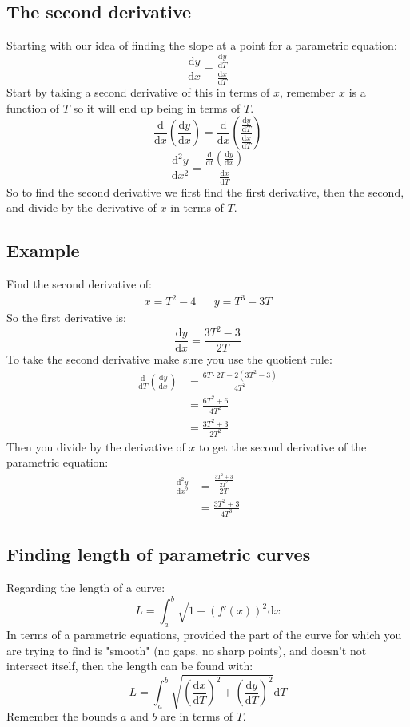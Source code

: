 \documentclass{report}
\begin{document}
    \subsection{The second derivative}
        Starting with our idea of finding the slope at a point for a parametric equation:
        \[\frac{\mathrm{d}y}{\mathrm{d}x} = \frac{\frac{\mathrm{d}y}{\mathrm{d}T}}{\frac{\mathrm{d}x}{\mathrm{d}T}}\]
        Start by taking a second derivative of this in terms of \(x\), remember \(x\) is a function of \(T\) so it will end up being in terms of \(T\).
        \[\frac{\mathrm{d}}{\mathrm{d}x} \left( \frac{\mathrm{d}y}{\mathrm{d}x} \right) = \frac{\mathrm{d}}{\mathrm{d}x} \left( \frac{\frac{\mathrm{d}y}{\mathrm{d}T}}{\frac{\mathrm{d}x}{\mathrm{d}T}} \right)\]
        \[\frac{\mathrm{d}^2 y}{\mathrm{d} x^2} = \frac{\frac{\mathrm{d}}{\mathrm{d}t} \left( \frac{\mathrm{d}y}{\mathrm{d}x} \right)}{\frac{\mathrm{d}x}{\mathrm{d}T}}\]
        So to find the second derivative we first find the first derivative, then the second, and divide by the derivative of \(x\) in terms of \(T\).
    
    \subsection{Example}
        Find the second derivative of:
        \begin{align*}
            x = T^2 - 4 &&
            y = T^3 - 3T
        \end{align*}
        So the first derivative is:
        \[\frac{\mathrm{d}y}{\mathrm{d}x} = \frac{3T^2 - 3}{2T}\]
        To take the second derivative make sure you use the quotient rule:
        \begin{align*}
            \frac{\mathrm{d}}{\mathrm{d}T} \left( \frac{\mathrm{d}y}{ \mathrm{d}x} \right) &= \frac{6T \cdot 2T - 2 (3T^2 - 3)}{4T^2} \\
            &= \frac{6T^2 + 6}{4T^2} \\
            &= \frac{3T^2 + 3}{2T^2}
        \end{align*}
        Then you divide by the derivative of \(x\) to get the second derivative of the parametric equation:
        \begin{align*}
            \frac{\mathrm{d}^2 y}{\mathrm{d} x^2} &= \frac{\frac{3T^2 + 3}{2T^2}}{2T} \\
            &= \frac{3T^2 + 3}{4T^3}
        \end{align*}
    
    \subsection{Finding length of parametric curves}
        Regarding the length of a curve:
        \[L = \int_a^b \sqrt{1 + (f'(x))^2} \mathrm{d}x\]
        In terms of a parametric equations, provided the part of the curve for which you are trying to find is "smooth" (no gaps, no sharp points),
        and doesn't not intersect itself, then the length can be found with:
        \[L = \int_a^b \sqrt{\left(\frac{\mathrm{d}x}{\mathrm{d}T}\right)^2 + \left(\frac{\mathrm{d}y}{\mathrm{d}T}\right)^2} \mathrm{d}T\]
        Remember the bounds \(a\) and \(b\) are in terms of \(T\).
    
\end{document}
